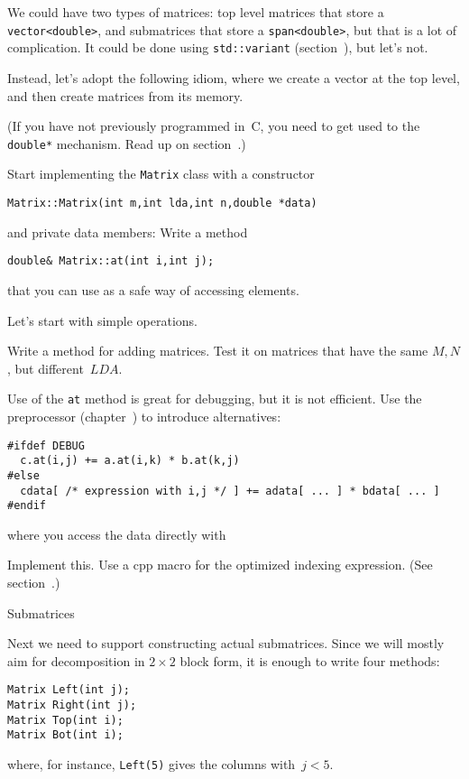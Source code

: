 We could have two types of matrices: top level matrices that store a
\lstinline{vector<double>}, and submatrices that store a
\lstinline{span<double>}, but that is a lot of complication.
It could be done using \lstinline{std::variant}
(section~), but let's not.

Instead,
let's adopt the following idiom, where we create a vector at the top
level, and then create matrices from its memory.
%

(If you have not previously programmed in~C, you need to get used to
the \lstinline{double*} mechanism. Read up on
section~.)

\begin{exercise}
  Start implementing the \lstinline{Matrix} class with a constructor
\begin{lstlisting}
Matrix::Matrix(int m,int lda,int n,double *data)
\end{lstlisting}
and private data members:
%
%
Write a method
\begin{lstlisting}
double& Matrix::at(int i,int j);  
\end{lstlisting}
that you can use as a safe way of accessing elements.
\end{exercise}

Let's start with simple operations.
\begin{exercise}
  Write a method for adding matrices. Test it on matrices that have
  the same $M,N$, but different~$\mathord{LDA}$.
\end{exercise}

Use of the \lstinline{at} method is great for debugging, but it is not
efficient. Use the preprocessor (chapter~) to introduce
alternatives:
\begin{lstlisting}
#ifdef DEBUG
  c.at(i,j) += a.at(i,k) * b.at(k,j)
#else
  cdata[ /* expression with i,j */ ] += adata[ ... ] * bdata[ ... ]
#endif
\end{lstlisting}
where you access the data directly with
%

\begin{exercise}
  Implement this. Use a cpp  macro for the
  optimized indexing expression. (See section~.)
\end{exercise}

 {Submatrices}

Next we need to support constructing actual submatrices. Since we will
mostly aim for decomposition in $2\times2$ block form, it is enough to
write four methods:
\begin{lstlisting}
Matrix Left(int j);
Matrix Right(int j);
Matrix Top(int i);
Matrix Bot(int i);
\end{lstlisting}
where, for instance, \lstinline{Left(5)} gives the columns with~$j<5$.

